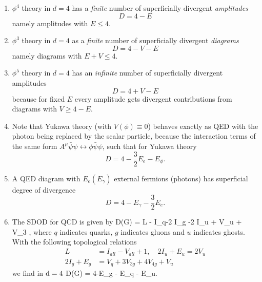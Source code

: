 \begin{enumerate}
	\item $\phi^4$ theory in $d=4$ has a \emph{finite} number of superficially divergent \emph{amplitudes}
	\begin{equation}
	\label{eq:renormalizationSdodphi4}
	D=4-E
	\end{equation}
	namely amplitudes with $E\leq 4$.
	\item $\phi^3$ theory in $d=4$ as a \emph{finite} number of superficially divergent \emph{diagrams}
	\begin{equation}
		D=4-V-E
	\end{equation}
	namely diagrams with $E+V\leq 4$.
	\item $\phi^5$ theory in $d=4$ has an \emph{infinite} number of superficially divergent amplitudes
	\begin{equation}
		D=4+V-E
	\end{equation}
because for fixed $E$ every amplitude gets divergent contributions from diagrams with $V \geq 4-E$.
\item Note that Yukawa theory (with $V(\phi)\equiv 0$) behaves exactly as QED with the photon being replaced by the scalar particle, because the interaction terms of the same form $A^\mu \bar{\psi} \psi \leftrightarrow\phi \bar{\psi} \psi$, such that for Yukawa theory
\begin{equation}
\label{eq:renormalizationSdodYukawa}
	D=4-\frac{3}{2}E_e-E_\phi.
\end{equation}
\item A QED diagram with $E_e(E_{\gamma})$ external fermions (photons) has superficial degree of divergence
\begin{equation} 
\label{eq:renormalizationSdodQED}
D = 4- E_{\gamma} - \frac{3}{2} E_e.
\end{equation}
\item The SDOD for QCD is given by 
\bse 
D(G) = \md \cdot L - I_q-2 I_g -2 I_u + V_u + V_{3 },
\ese 
where $q$ indicates quarks, $g$ indicates gluons and $u$ indicates ghosts. With the following topological relations
\begin{align*}
	L &= I_{all} - V_{all} +1, \quad 2 I_u + E_u = 2 V_u \\
	2 I_g + E_g &= V_q + 3 V_{3 g} + 4 V_{4 g} + V_u
\end{align*}
we find in $\mathrm{d}=4$
\be 
\label{eq:renormalizationSdodQCD}
D(G) = 4-E_g -  E_q - E_u.
\ee 

\end{enumerate}


